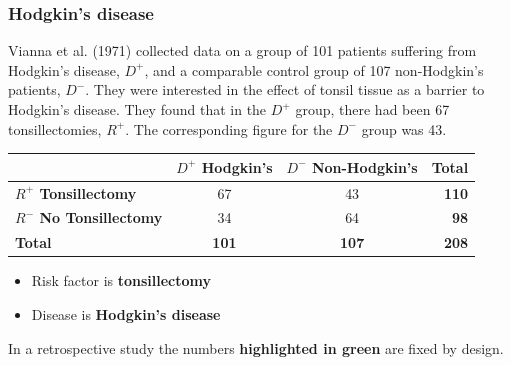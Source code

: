 \documentclass[a4paper]{article}
\begin{document}
\subsubsection{Hodgkin's disease}
Vianna et al. (1971) collected data on a group of 101 patients suffering from Hodgkin's disease, \textcolor{mygreen}{\( D^+ \)}, and a comparable control group of 107 non-Hodgkin's patients, \textcolor{mygreen}{\( D^- \)}.  They were interested in the effect of tonsil tissue as a barrier to Hodgkin's disease. They found that in the \textcolor{mygreen}{\( D^+ \)} group, there had been 67 tonsillectomies, \textcolor{myred}{\( R^+ \)}. The corresponding figure for the \textcolor{mygreen}{\( D^- \)} group was 43.
\begin{table}[H]
	\centering
	\begin{tabular}{@{}lccr@{}}
	\toprule
				 										   & \textcolor{mygreen}{\textbf{\( D^+ \) Hodgkin's}} & \textcolor{mygreen}{\textbf{\( D^- \) Non-Hodgkin's}} & \textbf{Total}    \\ \midrule
	\textcolor{myred}{\textbf{\( R^+ \) Tonsillectomy}}    & 67    		  									   & 43        		                                       & \textbf{110}  \\
	\textcolor{myred}{\textbf{\( R^- \) No Tonsillectomy}} & 34    		  									   & 64      		                                       & \textbf{98} \\ \midrule
	\textbf{Total} 										   & \textcolor{mygreen}{\textbf{101}}				   & \textcolor{mygreen}{\textbf{107}}                     & \textbf{208} \\ \bottomrule
	\end{tabular}
\end{table}
\begin{itemize}
	\item Risk factor is \textcolor{myred}{\textbf{tonsillectomy}}
	\item Disease is \textcolor{mygreen}{\textbf{Hodgkin's disease}}
\end{itemize}
In a retrospective study the numbers \textcolor{mygreen}{\textbf{highlighted in green}} are fixed by design.
\end{document}
